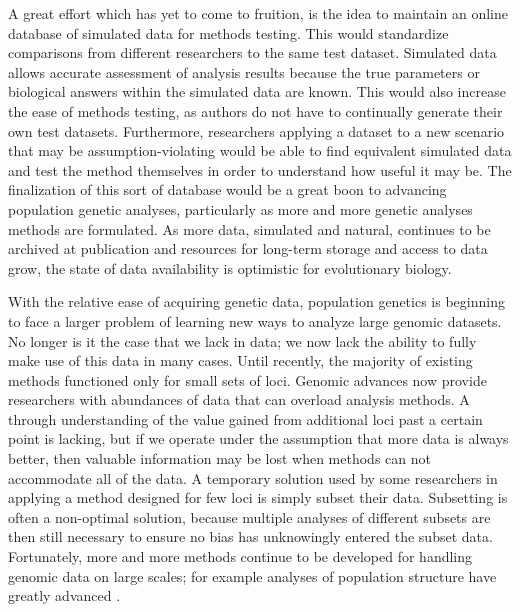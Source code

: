 A great effort which has yet to come to fruition, is the idea to maintain an online database of simulated data for methods testing. This would standardize comparisons from different researchers to the same test dataset. Simulated data allows accurate assessment of analysis results because the true parameters or biological answers within the simulated data are known. This would also increase the ease of methods testing, as authors do not have to continually generate their own test datasets. Furthermore, researchers applying a dataset to a new scenario that may be assumption-violating would be able to find equivalent simulated data and test the method themselves in order to understand how useful it may be. The finalization of this sort of database would be a great boon to advancing population genetic analyses, particularly as more and more genetic analyses methods are formulated. As more data, simulated and natural, continues to be archived at publication and resources for long-term storage and access to data grow, the state of data availability is optimistic for evolutionary biology.

With the relative ease of acquiring genetic data, population genetics is beginning to face a larger problem of learning new ways to analyze large genomic datasets. No longer is it the case that we lack in data; we now lack the ability to fully make use of this data in many cases. Until recently, the majority of existing methods functioned only for small sets of loci. Genomic advances now provide researchers with abundances of data that can overload analysis methods. A through understanding of the value gained from additional loci past a certain point is lacking, but if we operate under the assumption that more data is always better, then valuable information may be lost when methods can not accommodate all of the data. A temporary solution used by some researchers in applying a method designed for few loci is simply subset their data. Subsetting is often a non-optimal solution, because multiple analyses of different subsets are then still necessary to ensure no bias has unknowingly entered the subset data. Fortunately, more and more methods continue to be developed for handling genomic data on large scales; for example analyses of population structure have greatly advanced \citep{Raj:2014,Bradburd:2016, Petkova:2015}.

